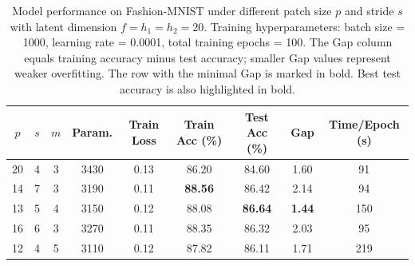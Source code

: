 \documentclass[pdflatex,sn-mathphys-num]{sn-jnl}%
\theoremstyle{thmstyleone}%
\theoremstyle{thmstyletwo}%
\theoremstyle{thmstylethree}%
\begin{document}

\begin{table}[htbp]
  \centering
 
  \caption{Model performance on Fashion-MNIST under different patch size $p$ and stride $s$ with latent dimension $f=h_1=h_2=20$. Training hyperparameters: batch size = 1000, learning rate = 0.0001, total training epochs = 100. The Gap column equals training accuracy minus test accuracy; smaller Gap values represent weaker overfitting. The row with the minimal Gap is marked in bold. Best test accuracy is also highlighted in bold.}
  \label{tab:14}
  \begin{tabular}{ccccccccc}
    \toprule
    $p$ & $s$ & $m$ & Param. & Train Loss & Train Acc (\%) & Test Acc (\%) & Gap & Time/Epoch (s) \\
    \midrule
20 & 4 & 3 & 3430 & 0.13 & 86.20 & 84.60 & 1.60 & 91 \\
14 & 7 & 3 & 3190 & 0.11 & \textbf{88.56} & 86.42 & 2.14 & 94 \\
13 & 5 & 4 & 3150 & 0.12 & 88.08 & \textbf{86.64} & \textbf{1.44} & 150 \\
16 & 6 & 3 & 3270 & 0.11 & 88.35 & 86.32 & 2.03 & 95 \\
12 & 4 & 5 & 3110 & 0.12 & 87.82 & 86.11 & 1.71 & 219\\
    \bottomrule
  \end{tabular}
\end{table}
\end{document}
